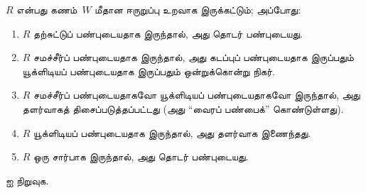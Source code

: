 \documentclass[../../../include/open-logic-section]{subfiles}
\begin{document}
\begin{prop}
  $R$ என்பது கணம்~$W$ மீதான ஈருறுப்பு உறவாக இருக்கட்டும்; அப்போது:
  \begin{enumerate}
  \item $R$ தற்சுட்டுப் பண்புடையதாக இருந்தால், அது தொடர் பண்புடையது.
  \item $R$ சமச்சீர்ப் பண்புடையதாக இருந்தால், அது கடப்புப் பண்புடையதாக
    இருப்பதும் யூக்ளிடியப் பண்புடையதாக இருப்பதும் ஒன்றுக்கொன்று நிகர்.
  \item $R$ சமச்சீர்ப் பண்புடையதாகவோ யூக்ளிடியப் பண்புடையதாகவோ இருந்தால்,
    அது தளர்வாகத் திசைப்படுத்தப்பட்டது (அது ``வைரப் பண்பைக்'' கொண்டுள்ளது).
  \item $R$ யூக்ளிடியப் பண்புடையதாக இருந்தால், அது தளர்வாக இணைந்தது.
  \item $R$ ஒரு சார்பாக இருந்தால், அது தொடர் பண்புடையது.
  \end{enumerate}
\end{prop}

\begin{prob}
   ஐ நிறுவுக.
\end{prob}
\end{document}
